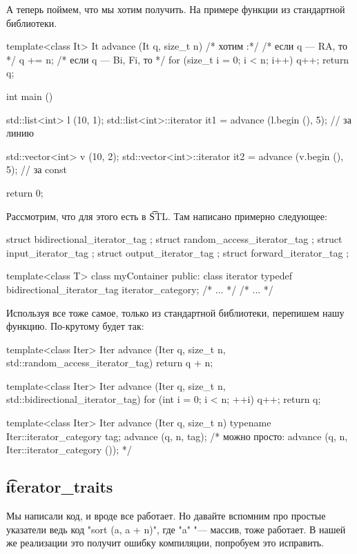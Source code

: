 А теперь поймем, что мы хотим получить.
На примере функции  из стандартной библиотеки.
\begin{cppcode}
template<class It>
It advance (It q, size_t n) {
    /* хотим :*/
    /* если q --- RA, то */
        q += n;
    /* если q --- Bi, Fi, то */
        for (size_t i = 0; i < n; i++)
            q++;
    return q;
}

int main () {
    std::list<int> l (10, 1); 
    std::list<int>::iterator    it1 = advance (l.begin (), 5); // за линию 

    std::vector<int> v (10, 2);
    std::vector<int>::iterator  it2 = advance (v.begin (), 5); // за const

    return 0;
}
\end{cppcode}

Рассмотрим, что для этого есть в \t{STL}. 
Там написано примерно следующее:
\begin{cppcode}
struct bidirectional_iterator_tag {};
struct random_access_iterator_tag {};
struct input_iterator_tag {};
struct output_iterator_tag {};
struct forward_iterator_tag {};

template<class T> 
class myContainer {
public:
    class iterator {
        typedef bidirectional_iterator_tag iterator_category;
        /* ... */
    }
    /* ... */
}
\end{cppcode}

Используя все тоже самое, только из стандартной библиотеки, перепишем нашу функцию.
По-крутому будет так:
\begin{cppcode}
template<class Iter>
Iter advance (Iter q, size_t n, std::random_access_iterator_tag) {
    return q + n;
}

template<class Iter>
Iter advance (Iter q, size_t n, std::bidirectional_iterator_tag) {
    for (int i = 0; i < n; ++i)
        q++;
    return q;
} 

template<class Iter>
Iter advance (Iter q, size_t n) {
    typename Iter::iterator_category tag;
    advance (q, n, tag);
    /* можно просто: advance (q, n, Iter::iterator_category ()); */
}
\end{cppcode}

\subsection{\t{iterator\_traits}}
Мы написали код, и вроде все работает. 
Но давайте вспомним про простые указатели ведь код \cpp"sort (a, a + n)", где \cpp"a" "--- массив, тоже работает. 
В нашей же реализации это получит ошибку компиляции, попробуем это исправить.

